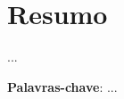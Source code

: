 \chapter*{\hspace{6.2cm}Resumo}\label{chp:resumo}
\thispagestyle{headings}
\thispagestyle{empty} 

{...

\textbf{Palavras-chave}: ...
}
